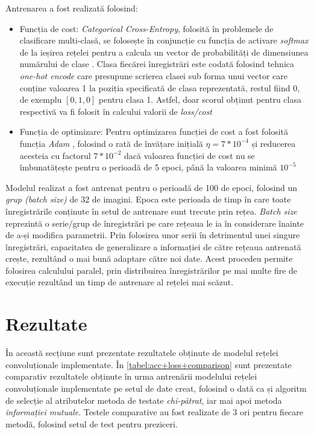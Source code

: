 Antrenarea a fost realizată folosind:
\begin{itemize}
\item Funcția de cost: \textit{Categorical Cross-Entropy}, folosită în problemele de clasificare multi-clasă, se folosește în conjuncție cu funcția de activare \textit{softmax} de la ieșirea rețelei pentru a calcula un vector de probabilități de dimensiunea numărului de clase \cite{online:CCE-loss}. Clasa fiecărei înregistrări este codată folosind tehnica \textit{one-hot encode} care presupune scrierea clasei sub forma unui vector care conține valoarea 1 la poziția specificată de clasa reprezentată, restul fiind 0, de exemplu $[0,1,0]$ pentru clasa 1. Astfel, doar scorul obținut pentru clasa respectivă va fi folosit în calcului valorii de \textit{loss/cost}
\item Funcția de optimizare: Pentru optimizarea funcției de cost a fost folosită funcția \textit{Adam} \cite{kingma2014adam}, folosind o rată de învățare inițială $\eta=7*10^{-4}$ și reducerea acesteia cu factorul $7*10^{-2}$ dacă valoarea funcției de cost nu se îmbunatățește pentru o perioadă de 5 epoci, până la valoarea minimă $10^{-5}$
\end{itemize}

Modelul realizat a fost antrenat pentru o perioadă de 100 de epoci, folosind un \textit{grup (batch size)} de 32 de imagini. Epoca este perioada de timp în care toate înregistrările conținute în setul de antrenare sunt trecute prin rețea. \textit{Batch size} reprezintă o serie/grup de înregistrări pe care rețeaua le ia în considerare înainte de a-și modifica parametrii. Prin folosirea unor serii în detrimentul unei singure înregistrări, capacitatea de generalizare a informației de către rețeaua antrenată crește, rezultând o mai bună adaptare către noi date. Acest procedeu permite folosirea calculului paralel, prin distribuirea înregistrărilor pe mai multe fire de execuție rezultând un timp de antrenare al rețelei mai scăzut. 

\section{Rezultate}
În această secțiune sunt prezentate rezultatele obținute de modelul rețelei convoluționale implementate. În \autoref{tabel:acc+loss+comparison} sunt prezentate comparativ rezultatele obținute în urma antrenării modelului rețelei convoluționale implementate pe setul de date creat, folosind o dată ca și algoritm de selecție al atributelor metoda de testate \textit{chi-pătrat}, iar mai apoi metoda \textit{informației mutuale}. Testele comparative au fost realizate de 3 ori pentru fiecare metodă, folosind setul de test pentru preziceri.

